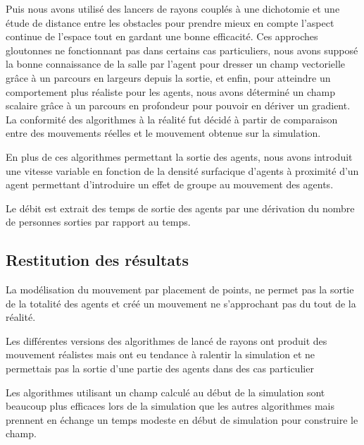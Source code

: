 \documentclass{article}
\begin{document}
Puis nous avons utilisé
des lancers de rayons couplés à une dichotomie et une étude de distance entre les
obstacles pour prendre mieux en compte l'aspect continue de l'espace tout en gardant
une bonne efficacité.
Ces approches gloutonnes ne fonctionnant pas dans certains
cas particuliers, nous avons supposé la bonne connaissance de la salle par l'agent
pour dresser un champ vectorielle grâce à un parcours en largeurs depuis la sortie,
et enfin, pour atteindre un comportement plus réaliste pour les agents, nous avons
déterminé un champ scalaire grâce à un parcours en profondeur pour pouvoir en dériver
un gradient. La conformité des algorithmes à la réalité fut décidé à partir de
comparaison entre des mouvements réelles et le mouvement obtenue sur la simulation.


En plus de ces algorithmes permettant la sortie des agents, nous avons introduit
une vitesse variable en fonction de la densité surfacique d'agents à proximité
d'un agent permettant d'introduire un effet de groupe au mouvement des agents.

Le débit est extrait des temps de sortie des agents par une dérivation du nombre
de personnes sorties par rapport au temps.

\subsection{Restitution des résultats}

La modélisation du mouvement par placement
de points, ne permet pas la sortie de la totalité des agents et créé un mouvement
ne s'approchant pas du tout de la réalité.


Les différentes versions des algorithmes de lancé de rayons ont produit des
mouvement réalistes mais ont eu tendance à ralentir la simulation et ne permettais
pas la sortie d'une partie des agents dans des cas particulier


Les algorithmes utilisant un champ calculé au début de la simulation sont beaucoup
plus efficaces lors de la simulation que les autres algorithmes mais prennent en échange
un temps modeste en début de simulation pour construire le champ.
\end{document}
